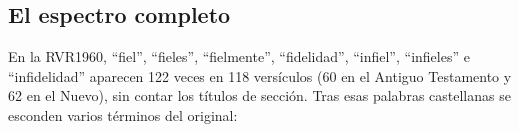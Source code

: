 
\subsection{El espectro completo}
En la RVR1960, ``fiel'', ``fieles'', ``fielmente'', ``fidelidad'', ``infiel'', ``infieles'' e ``infidelidad'' aparecen 122 veces en 118 versículos (60 en el Antiguo Testamento y 62 en el Nuevo), sin contar los títulos de sección. Tras esas palabras castellanas se esconden varios términos del original:

